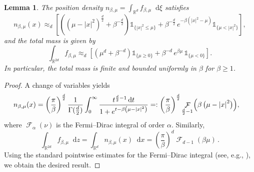 \documentclass[11pt]{amsart}
\theoremstyle{plain}
\newtheorem{lem}[theorem]{Lemma}
\theoremstyle{definition}
\newcommand		{\RR}		{\mathbb R}			%
\newcommand		{\R}		{\RR}
\newcommand		{\Rd}		{\R^d}
\newcommand		{\Rdd}		{\R^{2d}}
\newcommand		{\lt}			{\left}				%
\newcommand		{\rt}			{\right}			%
\renewcommand	{\(}			{\lt(}
\renewcommand	{\)}			{\rt)}
\newcommand		{\n}[1]			{\lt\lvert #1 \rt\rvert}
\newcommand		{\indic}	{\mathds{1}}		%
\renewcommand		{\d}		{\mathop{}\!\mathrm{d}}		%
\DeclareMathOperator{\cF}		{\mathcal{F}}		%
\newcommand		{\intd}			{\int_{\Rd}}
\newcommand		{\intdd}		{\int_{\Rdd}}
\begin{document}
	\begin{lem}
		The position density $n_{\beta, \mu} = \intd f_{\beta, \mu} \d \xi$ satisfies
		\begin{equation*}
			n_{\beta, \mu}(x)
			\approx_d \left[ \lt((\mu-\n{x}^2)^\frac{d}{2}+\beta^{-\frac{d}{2}}\rt)\indic_{\{\n{x}^2 \le \mu\}} + \beta^{-\frac{d}{2}} \, e^{-\beta (\n{x}^2-\mu)}\indic_{\{\mu< \n{x}^2\}}\right],
		\end{equation*}
		and the total mass is given by 
		\begin{equation}\label{eq:mass_classical}
			\intdd f_{\beta, \mu} \approx_d \left[\left(\mu^d + \beta^{-d}\right)\indic_{\{\mu \ge 0\}}+ \beta^{-d} \,e^{\beta \mu}\,\indic_{\{\mu < 0\}}\right].
		\end{equation}
		In particular, the total mass is finite and bounded uniformly in $\beta$ for $\beta\ge 1$. 
	\end{lem}
	
	\begin{proof}
		A change of variables yields
		\begin{align*}
			n_{\beta,\mu}(x)
			&= \lt(\frac{\pi}{\beta}\rt)^{\frac{d}{2}}\frac{1}{\Gamma(\frac{d}{2})}\int^\infty_0 \frac{t^{\frac{d}{2}-1} \d t}{1+e^{t - \beta\lt(\mu-\n{x}^2\rt)}} =: \lt(\frac{\pi}{\beta}\rt)^{\frac{d}{2}}\cF_{\frac{d}{2}-1}\Bigl(\beta\,\bigl(\mu-\n{x}^2\bigr)\Bigr) ,
		\end{align*}
		where $\cF_{\alpha}(\nu)$ is the Fermi--Dirac integral of order $\alpha$. Similarly,
		\begin{equation*}
			\intdd f_{\beta, \mu}\d z = \intd n_{\beta, \mu}(x)\d x = \lt(\frac{\pi}{\beta}\rt)^d \cF_{d-1}(\beta\mu) \, .
		\end{equation*}
		Using the standard pointwise estimates for the Fermi--Dirac integral (see, e.g., \cite[Lemma 18]{herda_charge_2025}), we obtain the desired result. 
	\end{proof}
	
\end{document}
